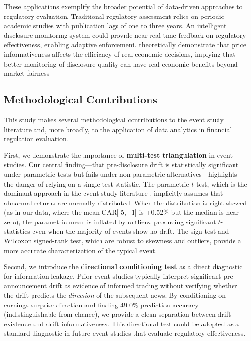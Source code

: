 \documentclass[manuscript,review]{acmart}
\begin{document}
These applications exemplify the broader potential of data-driven approaches to regulatory evaluation. Traditional regulatory assessment relies on periodic academic studies with publication lags of one to three years. An intelligent disclosure monitoring system could provide near-real-time feedback on regulatory effectiveness, enabling adaptive enforcement. \citet{goldstein2007manipulation} theoretically demonstrate that price informativeness affects the efficiency of real economic decisions, implying that better monitoring of disclosure quality can have real economic benefits beyond market fairness.

\subsection{Methodological Contributions}

This study makes several methodological contributions to the event study literature and, more broadly, to the application of data analytics in financial regulation evaluation.

First, we demonstrate the importance of \textbf{multi-test triangulation} in event studies. Our central finding---that pre-disclosure drift is statistically significant under parametric tests but fails under non-parametric alternatives---highlights the danger of relying on a single test statistic. The parametric $t$-test, which is the dominant approach in the event study literature \cite{mackinlay1997event, kothari2016econometrics}, implicitly assumes that abnormal returns are normally distributed. When the distribution is right-skewed (as in our data, where the mean CAR[-5,$-$1] is +0.52\% but the median is near zero), the parametric mean is inflated by outliers, producing significant $t$-statistics even when the majority of events show no drift. The sign test and Wilcoxon signed-rank test, which are robust to skewness and outliers, provide a more accurate characterization of the typical event.

Second, we introduce the \textbf{directional conditioning test} as a direct diagnostic for information leakage. Prior event studies typically interpret significant pre-announcement drift as evidence of informed trading without verifying whether the drift predicts the \textit{direction} of the subsequent news. By conditioning on earnings surprise direction and finding 49.0\% prediction accuracy (indistinguishable from chance), we provide a clean separation between drift existence and drift informativeness. This directional test could be adopted as a standard diagnostic in future event studies that evaluate regulatory effectiveness.
\end{document}

